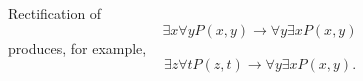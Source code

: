 

\setcounter{section}{1}
\setcounter{subsection}{2}
\setcounter{dfn}{5}

\begin{exl}
Rectification of
\[
\exists x \forall y P(x,y) \to \forall y \exists x P(x,y)
\]
produces, for example,
\[
\exists z \forall t P(z,t) \to \forall y \exists x P(x,y).
\]
\end{exl}


